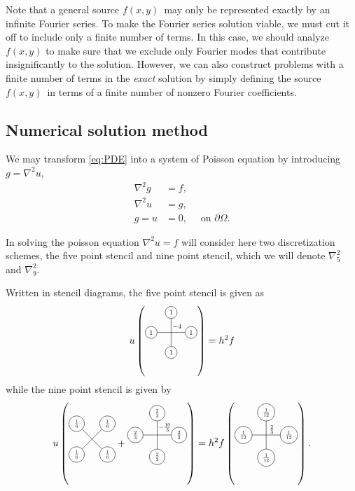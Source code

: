 Note that a general source $f(x,y)$ may only be represented exactly by an infinite Fourier series.
To make the Fourier series solution viable, we must cut it off to include only a finite number of terms.
In this case, we should analyze $f(x,y)$ to make sure that we exclude only Fourier modes that contribute insignificantly to the solution.
However, we can also construct problems with a finite number of terms in the \emph{exact} solution by simply defining the source $f(x,y)$ in terms of a finite number of nonzero Fourier coefficients.


\subsection{Numerical solution method}

We may transform \eqref{eq:PDE} into a system of Poisson equation by introducing $g = \nabla^2 u$,
\begin{align}\label{eq:PDE-poisson}
  \nabla^2g &= f,\\
  \nabla^2u &= g,\\
  g = u &= 0,\quad \text{ on } \partial \Omega.
\end{align}


In solving the poisson equation $\nabla^2 u = f$ will consider here two discretization schemes, the five point stencil and nine point stencil, which we will denote $\nabla_5^2$ and $\nabla_9^2$.

\newcommand{\crossStencil}[5]{%
  \begin{tikzpicture}[scale=0.5,baseline=1mm, every node/.style={scale=0.7}, nodes={draw, circle}]
    \draw node[below]{$#1$} (0,0) -- (0,2) node[above]{$#2$};
    \draw (-1, 1) node[left]{$#3$} -- (1, 1) node[right]{$#4$};
    \node[above right, draw=none] at (0,1) {$#5$};
  \end{tikzpicture}
}

\newcommand{\xStencil}[4]{%
  \begin{tikzpicture}[scale=0.5,baseline=1mm, every node/.style={scale=0.7}, nodes={draw, circle}]
    \draw node[below left]{$#1$} (0,0) -- (1.41, 1.41) node[above right]{$#2$};
    \draw (0, 1.41) node[above left]{$#3$} -- (1.41, 0) node[below right]{$#4$};
  \end{tikzpicture}
}

Written in stencil diagrams, the five point stencil is given as 
$$
u \left(\crossStencil{1}{1}{1}{1}{-4}\right) = h^2 f
$$
while the nine point stencil is given by
$$
u
\left(
\xStencil{\frac16}{\frac16}{\frac16}{\frac16}
+
\crossStencil{\frac23}{\frac23}{\frac23}{\frac23}{-\frac{10}{3}}
\right)
=
h^2
f
\left(
\crossStencil{\frac1{12}}{\frac1{12}}{\frac1{12}}{\frac1{12}}{\frac23}
\right).
$$


